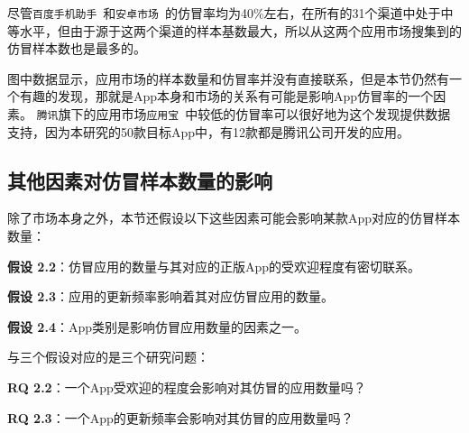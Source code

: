 尽管\texttt{百度手机助手}~\cite{Baiduappstore}和\texttt{安卓市场}~\cite{Hiapk}的仿冒率均为40\%左右，在所有的31个渠道中处于中等水平，但由于源于这两个渠道的样本基数最大，所以从这两个应用市场搜集到的仿冒样本数也是最多的。

图中数据显示，应用市场的样本数量和仿冒率并没有直接联系，但是本节仍然有一个有趣的发现，那就是App本身和市场的关系有可能是影响App仿冒率的一个因素。
\texttt{腾讯}旗下的应用市场\texttt{应用宝}~\cite{Myapp}中较低的仿冒率可以很好地为这个发现提供数据支持，因为本研究的50款目标App中，有12款都是腾讯公司开发的应用。

\subsection{其他因素对仿冒样本数量的影响}
除了市场本身之外，本节还假设以下这些因素可能会影响某款App对应的仿冒样本数量：

{\bf 假设 2.2}：仿冒应用的数量与其对应的正版App的受欢迎程度有密切联系。

{\bf 假设 2.3}：应用的更新频率影响着其对应仿冒应用的数量。

{\bf 假设 2.4}：App类别是影响仿冒应用数量的因素之一。

与三个假设对应的是三个研究问题：

{\bf RQ 2.2}：一个App受欢迎的程度会影响对其仿冒的应用数量吗？

{\bf RQ 2.3}：一个App的更新频率会影响对其仿冒的应用数量吗？


